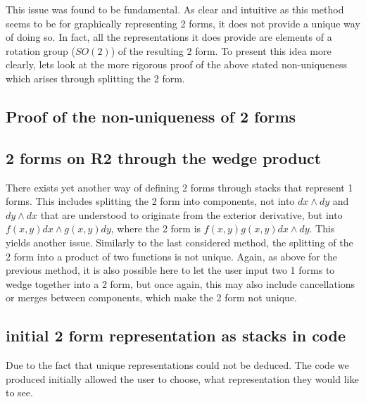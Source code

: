 \documentclass[11]{report}
\begin{document}
This issue was found to be fundamental. As clear and intuitive as this method seems to be for graphically representing 2 forms, it does not provide a unique way of doing so. In fact, all the representations it does provide are elements of a rotation group ($SO(2)$) of the resulting 2 form. To present this idea more clearly, lets look at the more rigorous proof of the above stated non-uniqueness which arises through splitting the 2 form.

\subsection{Proof of the non-uniqueness of 2 forms}





\subsection{2 forms on R2 through the wedge product}
There exists yet another way of defining 2 forms through stacks that represent 1 forms. This includes splitting the 2 form into components, not into $dx\wedge dy$ and $dy\wedge dx$ that are understood to originate from the exterior derivative, but into $f(x, y)dx \wedge g(x, y)dy$, where the 2 form is $f(x,y)g(x,y) dx\wedge dy$. This yields another issue. Similarly to the last considered method, the splitting of the 2 form into a product of two functions is not unique. Again, as above for the previous method, it is also possible here to let the user input two 1 forms to wedge together into a 2 form, but once again, this may also include cancellations or merges between components, which make the 2 form not unique.

\subsection{initial 2 form representation as stacks in code}
Due to the fact that unique representations could not be deduced. The code we produced initially allowed the user to choose, what representation they would like to see.
\end{document}
